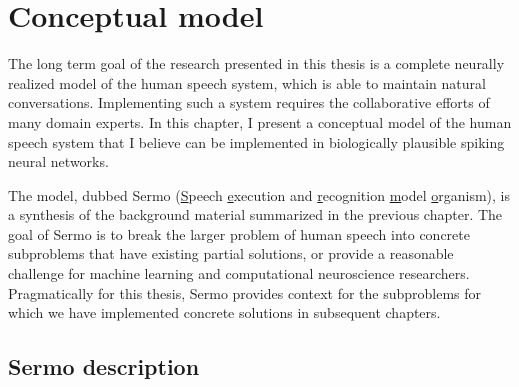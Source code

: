 \chapter{Conceptual model}
\label{chapt:model}

The long term goal of the research
presented in this thesis
is a complete neurally realized model
of the human speech system,
which is able to maintain
natural conversations.
Implementing such a system
requires the collaborative efforts
of many domain experts.
In this chapter, I present
a conceptual model of the human speech system
that I believe can be implemented
in biologically plausible spiking neural networks.

The model, dubbed Sermo
(\underline{S}peech \underline{e}xecution and \underline{r}ecognition
\underline{m}odel \underline{o}rganism),
is a synthesis of the background material
summarized in the previous chapter.
The goal of Sermo
is to break the larger
problem of human speech
into concrete subproblems
that have existing partial solutions,
or provide a reasonable challenge
for machine learning
and computational neuroscience researchers.
Pragmatically for this thesis,
Sermo provides context for
the subproblems for which
we have implemented concrete solutions
in subsequent chapters.

\section{Sermo description}
\label{sec:sermo}


